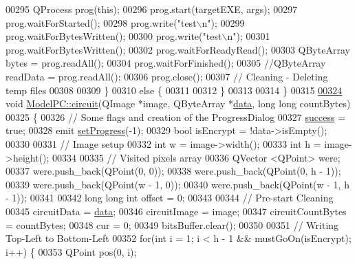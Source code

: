 \begin{DoxyCode}
00295         QProcess prog(\textcolor{keyword}{this});
00296         prog.start(targetEXE, args);
00297         prog.waitForStarted();
00298         prog.write(\textcolor{stringliteral}{"test\(\backslash\)n"});
00299         prog.waitForBytesWritten();
00300         prog.write(\textcolor{stringliteral}{"test\(\backslash\)n"});
00301         prog.waitForBytesWritten();
00302         prog.waitForReadyRead();
00303         QByteArray bytes = prog.readAll();
00304         prog.waitForFinished();
00305         \textcolor{comment}{//QByteArray readData = prog.readAll();}
00306         prog.close();
00307         \textcolor{comment}{// Cleaning - Deleting temp files}
00308 
00309     \}
00310     \textcolor{keywordflow}{else} \{
00311 
00312     \}
00313 
00314 \}
00315 
\hypertarget{modelpc_8cpp_source_l00324}{}\hyperlink{class_model_p_c_a1d0091062a0c836b283ec2f67411623b}{00324} \textcolor{keywordtype}{void} \hyperlink{class_model_p_c_a1d0091062a0c836b283ec2f67411623b}{ModelPC::circuit}(QImage *image, QByteArray *\hyperlink{namespace_errors_dict_setup_adf4c30d205d29df7343e26f7c62b0685}{data}, \textcolor{keywordtype}{long} \textcolor{keywordtype}{long} countBytes)
00325 \{
00326     \textcolor{comment}{// Some flags and creation of the ProgressDialog}
00327     \hyperlink{class_model_p_c_a945ffbbc44a832b953c191debd448f4c}{success} = \textcolor{keyword}{true};
00328     emit \hyperlink{class_model_p_c_afdcd80f0ed5062e145a71f09b0897547}{setProgress}(-1);
00329     \textcolor{keywordtype}{bool} isEncrypt = !data->isEmpty();
00330 
00331     \textcolor{comment}{// Image setup}
00332     \textcolor{keywordtype}{int} w = image->width();
00333     \textcolor{keywordtype}{int} h = image->height();
00334 
00335     \textcolor{comment}{// Visited pixels array}
00336     QVector <QPoint> were;
00337     were.push\_back(QPoint(0, 0));
00338     were.push\_back(QPoint(0, h - 1));
00339     were.push\_back(QPoint(w - 1, 0));
00340     were.push\_back(QPoint(w - 1, h - 1));
00341 
00342     \textcolor{keywordtype}{long} \textcolor{keywordtype}{long} \textcolor{keywordtype}{int} offset = 0;
00343 
00344     \textcolor{comment}{// Pre-start Cleaning}
00345     circuitData = \hyperlink{namespace_errors_dict_setup_adf4c30d205d29df7343e26f7c62b0685}{data};
00346     circuitImage = image;
00347     circuitCountBytes = countBytes;
00348     cur = 0;
00349     bitsBuffer.clear();
00350 
00351     \textcolor{comment}{// Writing Top-Left to Bottom-Left}
00352     \textcolor{keywordflow}{for}(\textcolor{keywordtype}{int} i = 1; i < h - 1 && mustGoOn(isEncrypt); i++) \{
00353         QPoint pos(0, i);

\end{DoxyCode}
